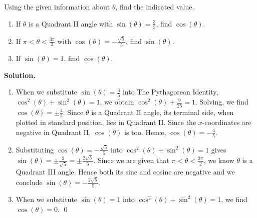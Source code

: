 \begin{ex} \label{cosinesinepythidex} Using the given information about $\theta$, find the indicated value.

\begin{enumerate}

\item If $\theta$ is a Quadrant II angle with  $\sin(\theta) = \frac{3}{5}$, find $\cos(\theta)$.

\item If $\pi < \theta < \frac{3\pi}{2}$ with  $\cos(\theta) = -\frac{\sqrt{5}}{5}$, find $\sin(\theta)$.

\item  If $\sin(\theta) = 1$, find $\cos(\theta)$.

\end{enumerate}



{\bf Solution.}  \begin{enumerate} \item  When we substitute $\sin(\theta) = \frac{3}{5}$ into The Pythagorean Identity, $\cos^{2}(\theta) + \sin^{2}(\theta) = 1$, we obtain $\cos^{2}(\theta) + \frac{9}{25} = 1$.  Solving, we find $\cos(\theta) = \pm \frac{4}{5}$.  Since $\theta$ is a Quadrant II angle, its terminal side, when plotted in standard position, lies in Quadrant II.  Since the $x$-coordinates are negative in Quadrant II, $\cos(\theta)$ is too.  Hence, $\cos(\theta) = - \frac{4}{5}$.

\item Substituting $\cos(\theta) = -\frac{\sqrt{5}}{5}$ into $\cos^{2}(\theta) + \sin^{2}(\theta) = 1$ gives $\sin(\theta) = \pm \frac{2}{\sqrt{5}} = \pm \frac{2 \sqrt{5}}{5}$.  Since we are given that $\pi < \theta < \frac{3\pi}{2}$, we know $\theta$ is a Quadrant III angle. Hence both its sine and cosine are negative and we conclude $\sin(\theta) = -\frac{2 \sqrt{5}}{5}$.

\item  When we substitute $\sin(\theta) = 1$ into $\cos^{2}(\theta) + \sin^{2}(\theta) = 1$, we find $\cos(\theta) = 0$. \qed 

\end{enumerate}

\end{ex}

